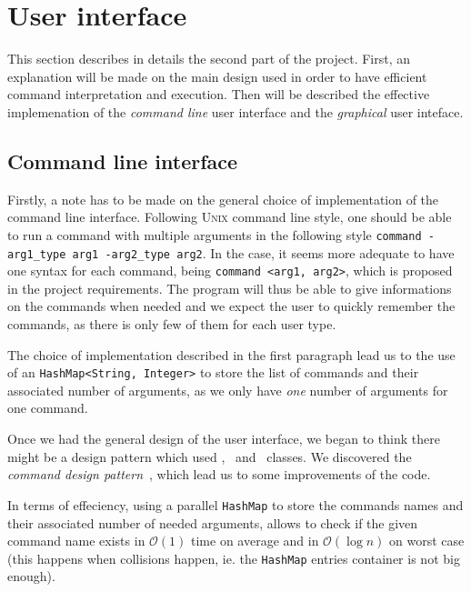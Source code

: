 \section{User interface} %
\label{sec:user_interface}
This section describes in details the second part of the project.
First, an explanation will be made on the main design used in order
to have efficient command interpretation and execution.
Then will be described the effective implemenation
of the \emph{command line} user interface and the \emph{graphical} user inteface.


\subsection{Command line interface} %
\label{sub:command_line_interface}

Firstly, a note has to be made on the general choice of implementation
of the command line interface.
Following \textsc{Unix} command line style, one should be able to run
a command with multiple arguments in the following
style \lstinline|command -arg1_type arg1 -arg2_type arg2|.
In the \MyFoodora case, it seems more adequate to have one syntax for each
command, being \lstinline|command <arg1, arg2>|, which is proposed in 
the project requirements. The program will thus be able to give informations
on the commands when needed and we expect the user to quickly remember 
the commands, as there is only few of them for each user type.
 
The choice of implementation described in the first paragraph
lead us to the use of an \lstinline|HashMap<String, Integer>| to
store the list of commands and their associated number of arguments,
as we only have \emph{one} number of arguments for one command.

Once we had the general design of the user interface, we began to
think there might be a design pattern which used \Command, \CommandLine~and
\CommandProcessor~classes.
We discovered the \emph{command design pattern}~\cite{wiki:commandPattern},
which lead us to some improvements of the code.

In terms of effeciency, using a parallel \lstinline|HashMap| to store
the commands names and their associated number of needed arguments,
allows to check if the given command name exists in $\mathcal{O}(1)$
time on average and in $\mathcal{O}(\log{n})$ on worst case
(this happens when collisions happen, ie. the \lstinline|HashMap|
entries container is not big enough)\cite{hashMap}.

